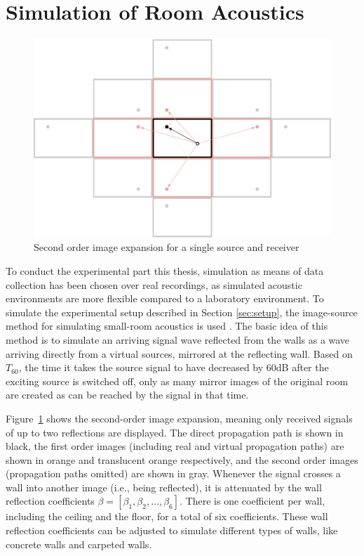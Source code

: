 \section{Simulation of Room Acoustics}  \label{sec:simulation}

\begin{figure}[!htp]
\centering
    \includegraphics[scale=0.7]{data/figures/image-method2}
    \caption{Second order image expansion for a single source and receiver}
    \label{fig:imageMethod}
\end{figure}

To conduct the experimental part this thesis, simulation as means of data collection has been chosen over real recordings, as simulated acoustic environments are more flexible compared to a laboratory environment. To simulate the experimental setup  described in Section \ref{sec:setup}, the image-source method for simulating small-room acoustics is used \cite{Allen1979}. The basic idea of this method is to simulate an arriving signal wave reflected from the walls as a wave arriving directly from a virtual sources, mirrored at the reflecting wall. Based on $T_{60}$, the time it takes the source signal to have decreased by 60dB after the exciting source is switched off, only as many mirror images of the original room are created as can be reached by the signal in that time.

Figure~\ref{fig:imageMethod} shows the second-order image expansion, meaning only received signals of up to two reflections are displayed. The direct propagation path is shown in black, the first order images (including real and virtual propagation paths) are shown in orange and translucent orange respectively, and the second order images (propagation paths omitted) are shown in gray. Whenever the signal crosses a wall into another image (i.e., being reflected), it is attenuated by the wall reflection coefficients $\beta = [\beta_1, \beta_2,\dots,\beta_6]$. There is one coefficient per wall, including the ceiling and the floor, for a total of six coefficients. These wall reflection coefficients can be adjusted to simulate different types of walls, like concrete walls and carpeted walls.

